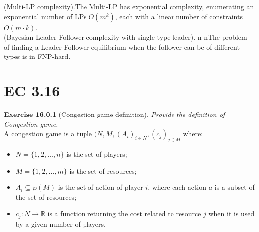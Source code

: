(Multi-LP complexity).The Multi-LP has exponential complexity, enumerating an exponential number of LPs $O(m^k)$, each with a linear number of constraints $O(m \cdot k)$.\\
(Bayesian Leader-Follower complexity with single-type leader). n nThe problem of finding a Leader-Follower equilibrium when the follower can be of different types is in \textsf{FNP}-hard.


\section{EC 3.16}

\textbf{Exercise 16.0.1} (Congestion game definition). \textit{Provide the definition of Congestion game.}\\

A congestion game is a tuple $(N,M, (A_i)_{i \in N}, (c_j)_{j \in M}$ where:
\begin{itemize}
\item $N= \{1,2,\ldots,n\}$ is the set of players;
\item $M= \{1,2,\ldots,m\}$ is the set of resources;
\item $A_i \subseteq \wp (M)$ is the set of action of player $i$, where each action $a$ is a subset of the set of resources;
\item $c_j: N \rightarrow \mathbb{R}$ is a function returning the cost related to resource $j$ when it is used by a given number of players.
\end{itemize}

